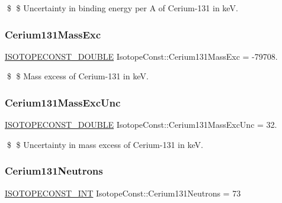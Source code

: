 \$ \$ Uncertainty in binding energy per A of Cerium-\/131 in keV. \mbox{\label{group___isotope_const-_cerium-_ce131_ga81dd5141c0d7c9e3e679bf71d282eb5d}} 
\subsubsection{\texorpdfstring{Cerium131\+Mass\+Exc}{Cerium131MassExc}}
{\footnotesize\ttfamily \mbox{\hyperlink{group___isotope_const-_macros_ga8f45a7272ce02c0b4c65c44636ed719a}{I\+S\+O\+T\+O\+P\+E\+C\+O\+N\+S\+T\+\_\+\+D\+O\+U\+B\+LE}} Isotope\+Const\+::\+Cerium131\+Mass\+Exc = -\/79708.}

\$ \$ Mass excess of Cerium-\/131 in keV. \mbox{\label{group___isotope_const-_cerium-_ce131_ga35cccfe4265cbfb2e2a28536b2be49d5}} 
\subsubsection{\texorpdfstring{Cerium131\+Mass\+Exc\+Unc}{Cerium131MassExcUnc}}
{\footnotesize\ttfamily \mbox{\hyperlink{group___isotope_const-_macros_ga8f45a7272ce02c0b4c65c44636ed719a}{I\+S\+O\+T\+O\+P\+E\+C\+O\+N\+S\+T\+\_\+\+D\+O\+U\+B\+LE}} Isotope\+Const\+::\+Cerium131\+Mass\+Exc\+Unc = 32.}

\$ \$ Uncertainty in mass excess of Cerium-\/131 in keV. \mbox{\label{group___isotope_const-_cerium-_ce131_ga8ea70fc98dc376b0caee056b589993e3}} 
\subsubsection{\texorpdfstring{Cerium131\+Neutrons}{Cerium131Neutrons}}
{\footnotesize\ttfamily \mbox{\hyperlink{group___isotope_const-_macros_ga5f18360b3e99483a35c32d789e62621c}{I\+S\+O\+T\+O\+P\+E\+C\+O\+N\+S\+T\+\_\+\+I\+NT}} Isotope\+Const\+::\+Cerium131\+Neutrons = 73}

